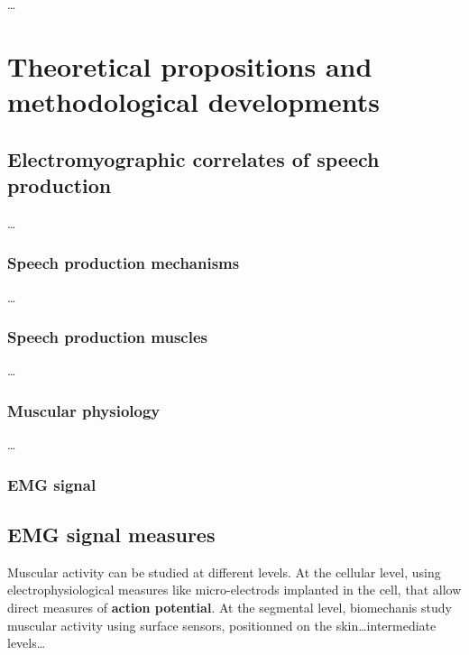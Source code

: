 \documentclass[a4paper,11pt,oneside,oldfontcommands]{memoir}
\begin{document}
\ldots{}

\chapter{Theoretical propositions and methodological
developments}\label{theoretical-propositions-and-methodological-developments}

\section{Electromyographic correlates of speech
production}\label{electromyographic-correlates-of-speech-production}

\ldots{}

\subsection{Speech production
mechanisms}\label{speech-production-mechanisms}

\ldots{}

\subsection{Speech production muscles}\label{speech-production-muscles}

\ldots{}

\subsection{Muscular physiology}\label{muscular-physiology}

\ldots{}

\subsection{EMG signal}\label{emg-signal}

\section{EMG signal measures}\label{emg-signal-measures}

Muscular activity can be studied at different levels. At the cellular
level, using electrophysiological measures like micro-electrods
implanted in the cell, that allow direct measures of \textbf{action
potential}. At the segmental level, biomechanis study muscular activity
using surface sensors, positionned on the skin\ldots{}intermediate
levels\ldots{}
\end{document}

